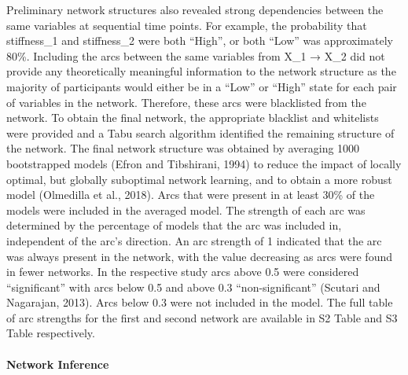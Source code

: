 \documentclass[
  english,
  man]{apa6}
\let\oldparagraph\paragraph
\renewcommand{\paragraph}[1]{\oldparagraph{#1}\mbox{}}
\begin{document}
Preliminary network structures also revealed strong dependencies between the same variables at sequential time points. For example, the probability that stiffness\_1 and stiffness\_2 were both ``High'', or both ``Low'' was approximately 80\%. Including the arcs between the same variables from X\_1 → X\_2 did not provide any theoretically meaningful information to the network structure as the majority of participants would either be in a ``Low'' or ``High'' state for each pair of variables in the network. Therefore, these arcs were blacklisted from the network.
To obtain the final network, the appropriate blacklist and whitelists were provided and a Tabu search algorithm identified the remaining structure of the network.
The final network structure was obtained by averaging 1000 bootstrapped models (Efron and Tibshirani, 1994) to reduce the impact of locally optimal, but globally suboptimal network learning, and to obtain a more robust model (Olmedilla et al., 2018). Arcs that were present in at least 30\% of the models were included in the averaged model.
The strength of each arc was determined by the percentage of models that the arc was included in, independent of the arc's direction. An arc strength of 1 indicated that the arc was always present in the network, with the value decreasing as arcs were found in fewer networks. In the respective study arcs above 0.5 were considered ``significant'' with arcs below 0.5 and above 0.3 ``non-significant'' (Scutari and Nagarajan, 2013).
Arcs below 0.3 were not included in the model. The full table of arc strengths for the first and second network are available in S2 Table and S3 Table respectively.

\hypertarget{network-inference}{%
\paragraph{Network Inference}\label{network-inference}}
\end{document}
